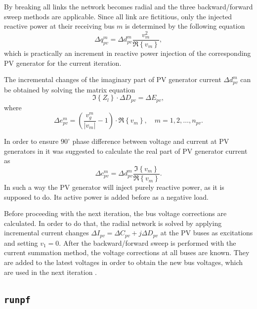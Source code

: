\documentclass[12pt]{article}
\numberwithin{equation}{section}
\numberwithin{table}{section}
\numberwithin{figure}{section}
\begin{document}
By breaking all links the network becomes radial \cite{luo1990} and the three backward/forward sweep methods are applicable. Since all link are fictitious, only the injected reactive power at their receiving bus $m$ is determined \cite{rajicic1994} by the following equation
\begin{equation}
\Delta q_{pv}^m = \Delta d_{pv}^m \frac{v_m^2}{\Re \left\{ v_m \right\} },
\end{equation}
which is practically an increment in reactive power injection of the corresponding PV generator for the current iteration.

The incremental changes of the imaginary part of PV generator current $\Delta d_{pv}^m$ can be obtained by solving the matrix equation
\begin{equation}
\Im \left\{ Z_l \right\}  \cdot \Delta D_{pv} = \Delta E_{pv},
\end{equation}
where
\begin{equation}
\Delta e_{pv}^m = \left( \frac{v_g^m}{ \left| v_m \right|  } - 1 \right) \cdot \Re \left\{ v_m \right\}, \quad m = 1, 2, \ldots , n_{pv}.
\end{equation}

In order to ensure $90^\circ$ phase difference between voltage and current at PV generators in \cite{Rajicic2001} it was suggested to calculate the real part of PV generator current as
\begin{equation}
\Delta c_{pv}^m = \Delta d_{pv}^m \frac{\Im \left\{ v_m \right\}}{\Re \left\{ v_m \right\}}.
\end{equation}
In such a way the PV generator will inject purely reactive power, as it is supposed to do. Its active power is added before as a negative load.

Before proceeding with the next iteration, the bus voltage corrections are calculated. In order to do that, the radial network is solved by applying incremental current changes $\Delta I_{pv} =  \Delta C_{pv} + j \Delta D_{pv}$ at the PV buses as excitations and setting $v_1 = 0$. After the backward/forward sweep is performed with the current summation method, the voltage corrections at all buses are known. They are added to the latest voltages in order to obtain the new bus voltages, which are used in the next iteration \cite{rajicic1994}.

\subsection{{\tt runpf}}
\label{sec:runpf}
\end{document}
